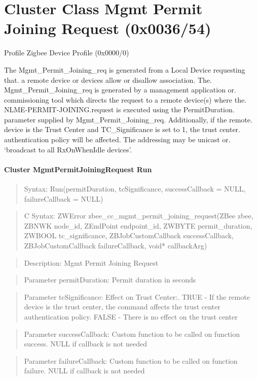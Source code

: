 \section{Cluster Class Mgmt Permit Joining Request (0x0036/54)}

Profile Zigbee Device Profile (0x0000/0)

The Mgmt\_Permit\_Joining\_req is generated from a Local Device requesting that. a remote device or devices allow or disallow association. The. Mgmt\_Permit\_Joining\_req is generated by a management application or. commissioning tool which directs the request to a remote device(s) where the. NLME-PERMIT-JOINING.request is executed using the PermitDuration. parameter supplied by Mgmt\_Permit\_Joining\_req. Additionally, if the remote. device is the Trust Center and TC\_Significance is set to 1, the trust center. authentication policy will be affected. The addressing may be unicast or. ‘broadcast to all RxOnWhenIdle devices’.
\paragraph{Cluster MgmtPermitJoiningRequest Run}
\begin{quote}Syntax: Run(permitDuration, tcSignificance, successCallback = NULL, failureCallback = NULL)\end{quote}
\begin{quote}C Syntax: ZWError zbee\_cc\_mgmt\_permit\_joining\_request(ZBee zbee, ZBNWK node\_id, ZEndPoint endpoint\_id, ZWBYTE permit\_duration, ZWBOOL tc\_significance, ZBJobCustomCallback successCallback, ZBJobCustomCallback failureCallback, void* callbackArg)\end{quote}
\begin{quote}Description: Mgmt Permit Joining Request\end{quote}
\begin{quote}Parameter permitDuration: Permit duration in seconds\end{quote}
\begin{quote}Parameter tcSignificance: Effect on Trust Center:. TRUE  - If the remote device is the trust center, the command affects the trust center authentication policy. FALSE - There is no effect on the trust center\end{quote}
\begin{quote}Parameter successCallback: Custom function to be called on function success. NULL if callback is not needed\end{quote}
\begin{quote}Parameter failureCallback: Custom function to be called on function failure. NULL if callback is not needed\end{quote}



